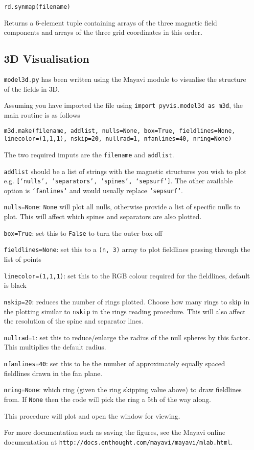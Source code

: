 \documentclass[12pt]{article}
\begin{document}
      \texttt{rd.synmap(filename)}

      Returns a 6-element tuple containing arrays of the three magnetic field components and arrays of the three grid coordinates in this order.

    \subsection{3D Visualisation}

      \texttt{model3d.py} has been written using the Mayavi module to visualise the structure of the fields in 3D.

      Assuming you have imported the file using \texttt{import pyvis.model3d as m3d}, the main routine is as follows
      
      \texttt{m3d.make(filename, addlist, nulls=None, box=True, fieldlines=None, linecolor=(1,1,1), nskip=20, nullrad=1, nfanlines=40, nring=None)}

      The two required imputs are the \texttt{filename} and \texttt{addlist}.
      
      \texttt{addlist} should be a list of strings with the magnetic structures you wish to plot e.g. \texttt{[`nulls', `separators', `spines', `sepsurf']}. The other available option is \texttt{`fanlines'} and would usually replace \texttt{`sepsurf'}.

      \texttt{nulls=None}: \texttt{None} will plot all nulls, otherwise provide a list of specific nulls to plot. This will affect which spines and separators are also plotted.

      \texttt{box=True}: set this to \texttt{False} to turn the outer box off

      \texttt{fieldlines=None}: set this to a \texttt{(n, 3)} array to plot fieldlines passing through the list of points
      
      \texttt{linecolor=(1,1,1)}: set this to the RGB colour required for the fieldlines, default is black

      \texttt{nskip=20}: reduces the number of rings plotted. Choose how many rings to skip in the plotting similar to \texttt{nskip} in the rings reading procedure. This will also affect the resolution of the spine and separator lines.

      \texttt{nullrad=1}: set this to reduce/enlarge the radius of the null spheres by this factor. This multiplies the default radius.

      \texttt{nfanlines=40}: set this to be the number of approximately equally spaced fieldlines drawn in the fan plane.

      \texttt{nring=None}: which ring (given the ring skipping value above) to draw fieldlines from. If \texttt{None} then the code will pick the ring a 5th of the way along.

      This procedure will plot and open the window for viewing.

      For more documentation such as saving the figures, see the Mayavi online documentation at \texttt{http://docs.enthought.com/mayavi/mayavi/mlab.html}.
\end{document}
